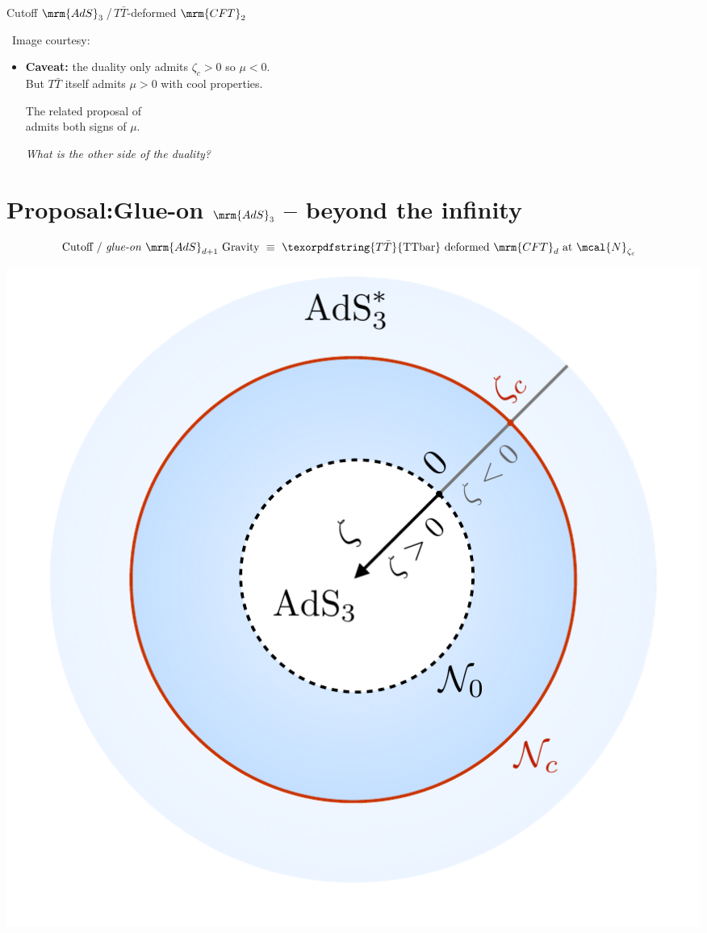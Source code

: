 \documentclass[10pt]{article}
\newcommand{\citations}[1]{{\footnotesize#1\par}}
\newcommand{\TTbar}{\texorpdfstring{\ensuremath{T\bar{T}}}{TTbar}\xspace}
\begin{document}
\begin{multicols}{3}
\begin{center}
	\vspace{-.5\baselineskip}\small
	Cutoff $\mrm{AdS}_3$\,/\,\TTbar-deformed $\mrm{CFT}_2$

	\vspace{-.2\baselineskip}
	\scriptsize\ Image courtesy: \textcite{AldegundePWSep22}
\end{center}


\begin{itemize}

\item[] \textbf{Caveat:} the duality only admits $\zeta_c > 0$ so $\mu < 0$.\\
But \TTbar itself admits $\mu > 0$ with cool properties.

\citations{The related proposal of \textcite{Guica:2019nzm}\\
admits both signs of $\mu$.}

\textit{What is the other side of the duality?}

\end{itemize}

\vspace{-\baselineskip}

\section*{\textbf{Proposal:}\texstringonly{\\}Glue-on $\mrm{AdS}_3$ -- beyond the infinity}
\label{se:glueonproposal}

\parbox{\linewidth}{
\vspace{-\baselineskip}
\begin{equation*}
\hspace{-.8em}
	\textrm{Cutoff / \textit{glue-on} $\mrm{AdS}_{d+1}$ Gravity}
	\ \equiv\ %
	\textrm{\TTbar deformed $\mrm{CFT}_{d}$ at $\mcal{N}_{\zeta_c}$}
\end{equation*}
\begin{center}
	\vspace{-.8\baselineskip}%
	\centering
	\includegraphics[width=.6\linewidth]{img/diagram.pdf}
	

\end{center}}
\end{multicols}
\end{document}
